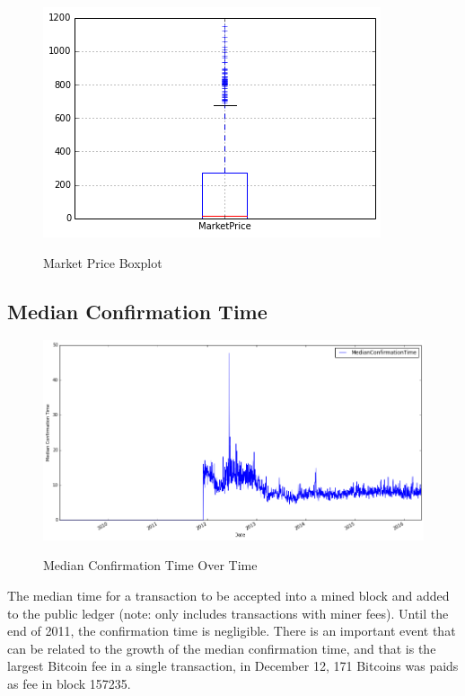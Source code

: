 \begin{figure}[bth]
  \myfloatalign
  {\includegraphics[width=1\linewidth]
    {gfx/market-price-boxplot}}
  \caption{Market Price Boxplot}
  \label{fig:market-price-boxplot}
\end{figure}

\clearpage

\subsection{Median Confirmation Time}
\label{sec:median-confirmation-time}

\begin{figure}[bth]
  \myfloatalign
  {\includegraphics[width=1\linewidth]
    {gfx/median-confirmation-time-over-time}}
  \caption{Median Confirmation Time Over Time}
  \label{fig:median-confirmation-time-over-time}
\end{figure}

The median time for a transaction to be accepted into a mined block
and added to the public ledger (note: only includes transactions with
miner fees). Until the end of 2011, the confirmation time is
negligible. There is an important event that can be related to the
growth of the median confirmation time, and that is the largest
Bitcoin fee in a single transaction, in December 12, 171 Bitcoins was
paids as fee in block 157235.

